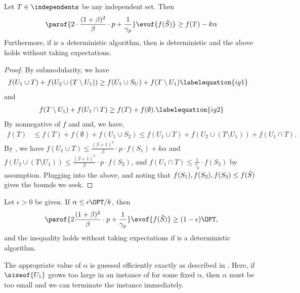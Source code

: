 \documentclass[oneside,letterpaper]{scrartcl} \usepackage{macros}
\begin{document}
\begin{lemma}
  Let $T \in \independents$ be any independent set. Then
  \begin{align*}
    \parof{2 \cdot \frac{(1+\beta)^2}{\beta} \cdot p +
      \frac{1}{\gamma_p}}
    \evof{f(\bestset)} \geq f(T) - k \alpha
  \end{align*}
  Furthermore, if  is a deterministic algorithm, then
   is deterministic and the above
  holds without taking expectations.
\end{lemma}
\begin{proof}
  By submodularity, we have
  \begin{align}
    f(U_1 \cup T) + f(U_2 \cup (T \setminus U_1)) \geq f(U_1 \cup S_U) + f(T \setminus U_1) &\labelequation{ig1}
  \end{align}
  and
  \begin{align}
    f(T \setminus U_1) + f(U_1 \cap T) \geq f(T) + f(\emptyset).
    \labelequation{ig2}
  \end{align}
  By nonnegative of $f$ and 
  and, we have,
  \begin{align*}
    f(T) &\leq f(T) + f(\emptyset) + f(U_1 \cup S_2) \leq f(U_1 \cup T) + f(U_2 \cup (T \setminus U_1)) + f(U_1 \cap T). \end{align*}
  By , we have $f(U_1 \cup T) \leq
  \frac{(\beta + 1)^2}{\beta} \cdot p \cdot f(S_1) + k \alpha$ and
  $f(U_2 \cup (T \setminus U_1)) \leq \frac{(\beta + 1)^2}{\beta}
  \cdot p \cdot f(S_2)$, and $f(U_1 \cap T) \leq \frac{1}{\gamma_p}
  \cdot f(S_3)$ by assumption. Plugging into the above, and noting
  that $f(S_1),f(S_2),f(S_3) \leq f(\hat{S})$ gives the bounds we
  seek.
\end{proof}
\begin{corollary}
  Let $\epsilon > 0$ be given. If $\alpha \leq \epsilon \OPT / k$,
  then
  \begin{align*}
    \parof{2\frac{(1+\beta)^2}{\beta} \cdot p + \frac{1}{\gamma_p}}
    \evof{f(\bestset)} \geq (1-\epsilon) \OPT,
  \end{align*}
  and the inequality holds without taking expectations if
   is a deterministic algorithm.
\end{corollary}


The appropriate value of $\alpha$ is guessed efficiently exactly as
described in . Here, if
$\sizeof{U_1}$ grows too large in an instance of
 for some fixed
$\alpha$, then $\alpha$ must be too small and we can terminate the
instance immediately.
\end{document}
